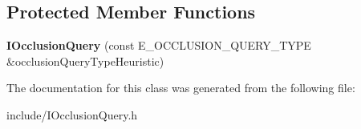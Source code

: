 \subsection*{Protected Member Functions}
\begin{DoxyCompactItemize}
\item 
{\bfseries I\+Occlusion\+Query} (const E\+\_\+\+O\+C\+C\+L\+U\+S\+I\+O\+N\+\_\+\+Q\+U\+E\+R\+Y\+\_\+\+T\+Y\+PE \&occlusion\+Query\+Type\+Heuristic)\hypertarget{classirr_1_1video_1_1IOcclusionQuery_ae5a69c234898dca7afe7fcffeadbeb44}{}\label{classirr_1_1video_1_1IOcclusionQuery_ae5a69c234898dca7afe7fcffeadbeb44}

\end{DoxyCompactItemize}


The documentation for this class was generated from the following file\+:\begin{DoxyCompactItemize}
\item 
include/I\+Occlusion\+Query.\+h\end{DoxyCompactItemize}
